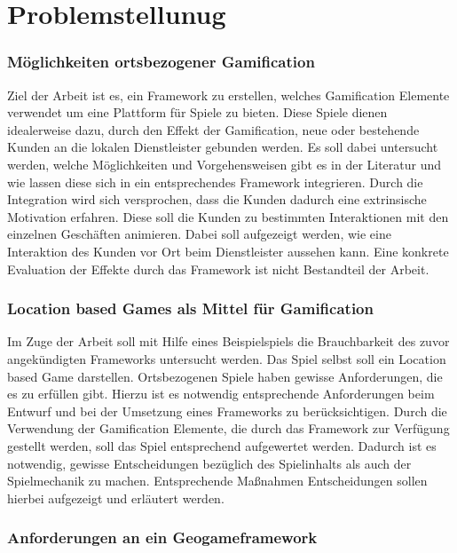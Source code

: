 \chapter{Problemstellunug}
\label{ch2:Problemstellunug}

\subsection*{Möglichkeiten ortsbezogener Gamification}

Ziel der Arbeit ist es, ein Framework zu erstellen, welches Gamification Elemente verwendet um eine Plattform  für Spiele zu bieten. Diese Spiele dienen idealerweise dazu, durch den Effekt der Gamification, neue oder bestehende Kunden an die lokalen Dienstleister gebunden werden. Es soll dabei untersucht werden, welche Möglichkeiten und Vorgehensweisen gibt es in der Literatur und wie lassen diese sich in ein entsprechendes Framework integrieren.
Durch die Integration wird sich versprochen, dass die Kunden dadurch eine extrinsische Motivation erfahren. Diese soll die Kunden zu bestimmten Interaktionen mit den einzelnen Geschäften animieren.
Dabei soll aufgezeigt werden, wie eine Interaktion des Kunden vor Ort beim Dienstleister aussehen kann. Eine konkrete Evaluation der Effekte durch das Framework ist nicht Bestandteil der Arbeit.

\subsection*{Location based Games als Mittel für Gamification}

Im Zuge der Arbeit soll mit Hilfe eines Beispielspiels die Brauchbarkeit des zuvor angekündigten Frameworks untersucht werden.
Das Spiel selbst soll ein Location based Game darstellen. Ortsbezogenen Spiele haben gewisse Anforderungen, die es zu erfüllen gibt. Hierzu 
ist es notwendig entsprechende Anforderungen beim Entwurf und bei der Umsetzung eines Frameworks zu berücksichtigen.
Durch die Verwendung der Gamification Elemente, die durch das Framework zur Verfügung gestellt werden, soll das Spiel entsprechend aufgewertet werden. Dadurch ist es notwendig, gewisse Entscheidungen bezüglich des Spielinhalts als auch der Spielmechanik zu machen.
Entsprechende Maßnahmen Entscheidungen sollen hierbei aufgezeigt und erläutert werden.

\subsection*{Anforderungen an ein Geogameframework}

